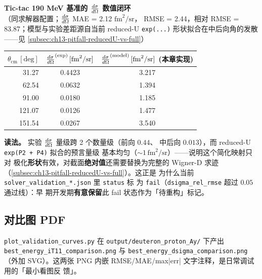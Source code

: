 \begin{numericalbox}
\textbf{Tic-tac 190 MeV 基准的 \(\frac{d\sigma}{d\Omega}\) 数值闭环}\\[4pt]
（同求解器配置；\(\frac{d\sigma}{d\Omega}\) MAE = 2.12 \(\text{fm}^2/\text{sr}\)，
RMSE = 2.44，相对 RMSE = 83.87；模型与实验差距源自当前 reduced-U
\texttt{exp(...)} 形状拟合在中后向角的发散——见 \cref{subsec:ch13-pitfall-reducedU-vs-full}）
\begin{center}
\begin{tabular}{rcc}
\toprule
\(\theta_{\text{cm}}\,[\text{deg}]\)
& \(\frac{d\sigma}{d\Omega}^{(\text{exp})}\,[\text{fm}^2/\text{sr}]\)
& \(\frac{d\sigma}{d\Omega}^{(\text{model})}\,[\text{fm}^2/\text{sr}]\) (本章实现) \\
\midrule
31.27  & 0.4423  & 3.217  \\
62.54  & 0.0632  & 1.394  \\
91.00  & 0.0180  & 1.185  \\
121.07 & 0.0126  & 1.477  \\
151.54 & 0.0267  & 3.540  \\
\bottomrule
\end{tabular}
\end{center}

\textbf{读法。} 实验 \(\frac{d\sigma}{d\Omega}\) 量级跨 2 个数量级（前向 \(0.44\)、
中后向 \(0.013\)），而 reduced-U \texttt{exp(P2 + P4)} 拟合的预言量级
基本均匀（\(\sim 1\,\text{fm}^2/\text{sr}\)）——说明这个简化映射只对
极化\textbf{形状}有效，对截面\textbf{绝对值}还需要替换为完整的
Wigner-D 求迹（\cref{subsec:ch13-pitfall-reducedU-vs-full}）。这正是
为什么当前 \texttt{solver\_validation\_*.json} 里 \texttt{status} 标
为 \texttt{fail}（\texttt{dsigma\_rel\_rmse} 超过 \(0.05\) 通过线）：早
期开发期\textbf{有意保留}此 fail 状态作为「待重构」标记。
\end{numericalbox}

\subsection{对比图 PDF}
\label{subsec:ch13-numerical-figures}

\texttt{plot\_validation\_curves.py} 在
\texttt{output/deuteron\_proton\_Ay/} 下产出
\texttt{best\_energy\_iT11\_comparison.png} 与
\texttt{best\_energy\_dsigma\_comparison.png}（外加 SVG）。这两张
PNG 内嵌 RMSE/MAE/max|err| 文字注释，是日常调试用的「最小看图反
馈」。

